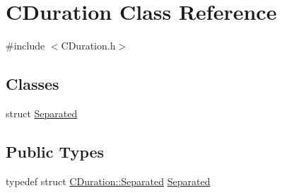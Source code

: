 \hypertarget{class_c_duration}{}\section{C\+Duration Class Reference}
\label{class_c_duration}


{\ttfamily \#include $<$C\+Duration.\+h$>$}

\subsection*{Classes}
\begin{DoxyCompactItemize}
\item 
struct \mbox{\hyperlink{struct_c_duration_1_1_separated}{Separated}}
\end{DoxyCompactItemize}
\subsection*{Public Types}
\begin{DoxyCompactItemize}
\item 
typedef struct \mbox{\hyperlink{struct_c_duration_1_1_separated}{C\+Duration\+::\+Separated}} \mbox{\hyperlink{class_c_duration_ab058caef213b4224494f8a9ef71db78a}{Separated}}
\end{DoxyCompactItemize}
